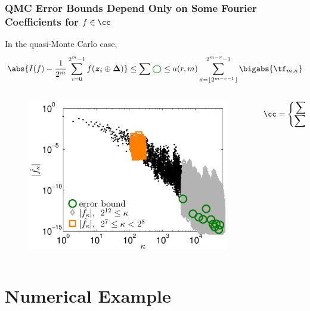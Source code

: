 \documentclass[11pt,compress]{beamer} %
\newcommand{\bsz}{\boldsymbol{z}}    %
\newcommand{\bsDelta}{\boldsymbol{\Delta}}    %
\begin{document}
\begin{frame}
\frametitle{QMC Error Bounds Depend Only on Some Fourier Coefficients for $f\in\cc$}
In the quasi-Monte Carlo case,
\[
\abs{I(f) - \frac{1}{2^m} \sum_{i=0}^{2^m-1} f(\bsz_i \oplus\bsDelta)}\leq \sum \textcolor{green_plot}{\boldsymbol{\bigcirc}}\leq
a(r,m)\sum_{\kappa=\left \lfloor 2^{m-r-1}\right \rfloor}^{2^{m-r}-1} \bigabs{\tf_{m,\kappa}}
\]
\vspace{-.5cm}
\begin{columns}
\begin{column}{0.6\textwidth}
\centering
\begin{figure}
\includegraphics[width=.8\textwidth]{Images/WalshCoeffExplanation.eps}
\end{figure}
\end{column}
\begin{column}{0.4\textwidth}
\centering
$\cc=\begin{Bmatrix}\displaystyle\sum\textcolor{orange_plot}{\pmb{\Box}}\text{ bounds }\sum\textcolor{gray_plot}{\boldsymbol{\Diamond}}\\
\displaystyle\sum\textcolor{gray_plot}{\boldsymbol{\Diamond}}\text{ bounds }\sum\textcolor{green_plot}{\boldsymbol{\bigcirc}}\end{Bmatrix}$
\end{column}
\end{columns}
\end{frame}

\section{Numerical Example}
\end{document}
